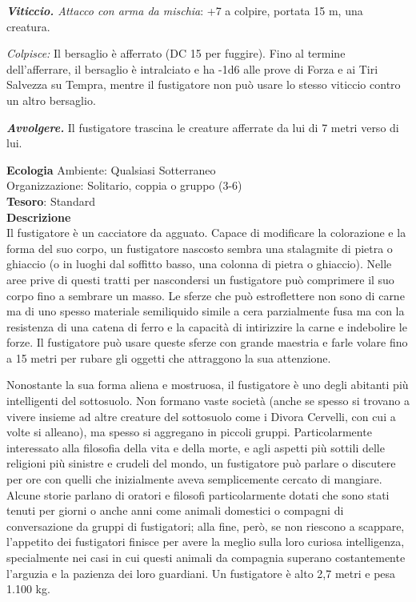 \begin{multicols}{2}
	\textit{\textbf{Viticcio.} Attacco con arma da mischia}: +7 a colpire, portata 15 m, una creatura.

	\textit{Colpisce:} Il bersaglio è afferrato (DC 15 per fuggire). Fino al termine dell'afferrare, il bersaglio è intralciato e ha -1d6 alle prove di Forza e ai Tiri Salvezza su Tempra, mentre il fustigatore non può usare lo stesso viticcio contro un altro bersaglio.

	\textit{\textbf{Avvolgere.}} Il fustigatore trascina le creature afferrate da lui di 7 metri verso di lui.

	\textbf{Ecologia}
	Ambiente: Qualsiasi Sotterraneo\\
	Organizzazione: Solitario, coppia o gruppo (3-6)\\
	\textbf{Tesoro}: Standard\\
	\textbf{Descrizione}\\
	Il fustigatore è un cacciatore da agguato. Capace di modificare la colorazione e la forma del suo corpo, un fustigatore nascosto sembra una stalagmite di pietra o ghiaccio (o in luoghi dal soffitto basso, una colonna di pietra o ghiaccio). Nelle aree prive di questi tratti per nascondersi un fustigatore può comprimere il suo corpo fino a sembrare un masso. Le sferze che può estroflettere non sono di carne ma di uno spesso materiale semiliquido simile a cera parzialmente fusa ma con la resistenza di una catena di ferro e la capacità di intirizzire la carne e indebolire le forze. Il fustigatore può usare queste sferze con grande maestria e farle volare fino a 15 metri per rubare gli oggetti che attraggono la sua attenzione.

	Nonostante la sua forma aliena e mostruosa, il fustigatore è uno degli abitanti più intelligenti del sottosuolo. Non formano vaste società (anche se spesso si trovano a vivere insieme ad altre creature del sottosuolo come i Divora Cervelli, con cui a volte si alleano), ma spesso si aggregano in piccoli gruppi. Particolarmente interessato alla filosofia della vita e della morte, e agli aspetti più sottili delle religioni più sinistre e crudeli del mondo, un fustigatore può parlare o discutere per ore con quelli che inizialmente aveva semplicemente cercato di mangiare. Alcune storie parlano di oratori e filosofi particolarmente dotati che sono stati tenuti per giorni o anche anni come animali domestici o compagni di conversazione da gruppi di fustigatori; alla fine, però, se non riescono a scappare, l'appetito dei fustigatori finisce per avere la meglio sulla loro curiosa intelligenza, specialmente nei casi in cui questi animali da compagnia superano costantemente l'arguzia e la pazienza dei loro guardiani.
	Un fustigatore è alto 2,7 metri e pesa 1.100 kg.



\end{multicols}
